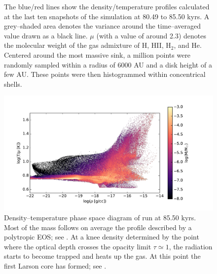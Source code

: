 \begin{figure}[!htb]
{                                            The blue/red lines show the density/temperature profiles calculated at the last ten snapshots of the simulation at 80.49 to 85.50 kyrs.
                                            A grey--shaded area denotes the variance around the time--averaged value drawn as a black line.
                                            $\mu$ (with a value of around 2.3) denotes the molecular weight of the gas admixture of H, HII, H$_{2}$, and He.
                                            Centered around the most massive sink, a million points were randomly sampled within a radius of 6000 AU and a disk height of a few AU.
                                            These points were then histogrammed within concentrical shells.}
\label{fig:var_rt_profile}
\end{figure}
\FloatBarrier

\begin{figure}[!htb]
 \centering
 \includegraphics[width=1.0\textwidth]{Figures/var_rt_larson_plots/rho_temp_hist_n1c10}
 \captionsetup{justification=justified,singlelinecheck=false,width=\linewidth}
 \decoRule
 \caption[$\rho$--T phase diagram]{Density--temperature phase space diagram of  run at 85.50 kyrs.
                                   Most of the mass follows on average the profile described by a polytropic EOS; see .
                                   At a knee density determined by the point where the optical depth crosses the opacity limit $\tau \simeq 1$, the radiation starts to become trapped and heats up the gas.
                                   At this point the first Larson core has formed; see .}
\label{fig:var_rt_larson_rhoT}
\end{figure}
\FloatBarrier


